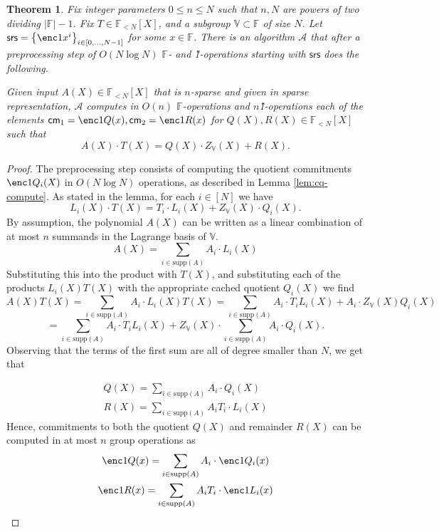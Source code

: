 \documentclass[11pt]{article} %
\newcommand{\alg}{\ensuremath{\mathscr{A}}\xspace}
\newcommand{\F}{\ensuremath{\mathbb F}\xspace}
\newcommand{\srs}{\ensuremath{\mathsf{srs}}\xspace}
\newcommand{\cm}{\ensuremath{\mathsf{cm}}\xspace}
\newcommand{\sett}[2]{\ensuremath{\set{#1}_{#2}}\xspace}
\newcommand{\set}[1]{\ensuremath{\left\{#1\right\}}\xspace}
\newcommand{\polysofdeg}[1]{\ensuremath{\F_{< #1}[X]}\xspace}
\newtheorem{thm}[lemma]{Theorem}
\newcommand{\bigspace}{\ensuremath{\mathbb{V}}\xspace}
\newcommand{\witsize}{\ensuremath{n}\xspace}
\newcommand{\tabsize}{\ensuremath{N}\xspace}
\newcommand{\tabruntime}{\ensuremath{\tabsize\log\tabsize}\xspace}
\newcommand{\supp}[1]{\ensuremath{\mathrm{supp}(#1)}\xspace}
\begin{document}
\begin{thm}\label{thm:sec3main}
Fix integer parameters $0\leq n\leq N$ such that $n,N$ are powers of two dividing $|\F|-1$. Fix $T\in \polysofdeg{\tabsize}$, and a subgroup $\bigspace\subset \F$ of size \tabsize. Let $\srs=\sett{\enc1{x^i}}{i\in[0,\ldots,\tabsize-1]}$ for some $x\in \F$. 
There is an algorithm \alg that after a preprocessing step of $O(\tabruntime)$ \F- and \G1-operations starting with \srs does the following.


Given input $A(X)\in \polysofdeg{\tabsize}$ that is \witsize-sparse and given in sparse representation, \alg computes in 
$O(\witsize)$ \F-operations and \witsize \G1-operations each of the elements
$\cm_1=\enc1{Q(x)},\cm_2=\enc1{R(x)}$ for $Q(X),R(X)\in \polysofdeg{\tabsize}$ such that
\[A(X)\cdot T(X) = Q(X)\cdot Z_{\bigspace}(X) + R(X).\]
\end{thm}
\begin{proof}
    The preprocessing step consists of computing the quotient commitments $\enc1{Q_i(X)}$ in $O(\tabruntime)$ operations, as described in Lemma \ref{lem:cq-compute}. As stated in the lemma,
    for each $i\in[\tabsize]$ we have
    \[L_i(X)\cdot T(X)=T_i\cdot L_i(X) + Z_\bigspace(X)\cdot Q_i(X).\]
    By assumption, the polynomial $A(X)$ can be written as a linear combination of
    at most $\witsize$ summands in the Lagrange basis of $\bigspace$.
    \[ A(X) = \sum_{i \in \supp{A}} A_i\cdot L_i(X) \]
    Substituting this into the product with $T(X)$, and substituting each of the products
    $L_i(X) T(X)$ with the appropriate cached quotient $Q_i(X)$ we find
    \[ A(X) T(X) = \sum_{i\in \supp{A}} A_i\cdot  L_i(X) T(X) =\sum_{i \in
    \supp{A}} A_i \cdot T_i L_i(X) + A_i\cdot Z_\bigspace(X) Q_i(X) \] 
   \[=\sum_{i \in  \supp{A}} A_i \cdot T_i L_i(X) +Z_\bigspace(X)\cdot \sum_{i \in
    \supp{A}} A_i \cdot Q_i(X).\] 
Observing that the terms of the first sum are all of degree smaller than \tabsize, we get that

    \begin{gather*}
Q(X)=\sum_{i \in  \supp{A}} A_i \cdot Q_i(X) \\
        R(X) = \sum_{i \in \supp{A}} A_i T_i \cdot L_i(X)
    \end{gather*}
    Hence, commitments to both the quotient $Q(X)$ and remainder $R(X)$ can be computed in
   at most \witsize group operations as 
    \begin{gather*}
        \enc1{Q(x)} = \sum_{i \in \supp{A}} A_i \cdot \enc1{Q_i(x)} \\
        \enc1{R(x)} = \sum_{i \in \supp{A}} A_i T_i \cdot \enc1{L_i(x)}
    \end{gather*}
\end{proof}
\end{document}
